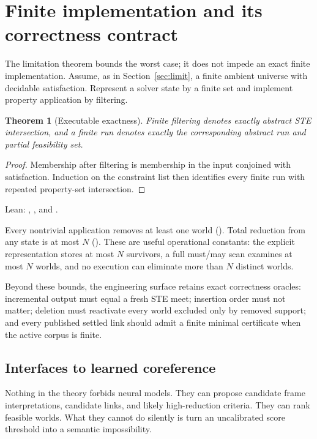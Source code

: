 \documentclass[11pt]{article}
\newtheorem{theorem}{Theorem}[section]
\theoremstyle{definition}
\theoremstyle{remark}
\begin{document}
\section{Finite implementation and its correctness contract}
\label{sec:implementation}

The limitation theorem bounds the worst case; it does not impede an exact
finite implementation.  Assume, as in Section~\ref{sec:limit}, a finite
ambient universe with decidable satisfaction.  Represent a solver state by a
finite set and implement property application by filtering.

\begin{theorem}[Executable exactness]
Finite filtering denotes exactly abstract STE intersection, and a finite run
denotes exactly the corresponding abstract run and partial feasibility set.
\end{theorem}
\begin{proof}
Membership after filtering is membership in the input conjoined with
satisfaction.  Induction on the constraint list then identifies every finite
run with repeated property-set intersection.
\end{proof}
\noindent Lean: , , and
.

Every nontrivial application removes at least one world
().  Total reduction from any state is at most $N$
().  These are useful operational constants:
the explicit representation stores at most $N$ survivors, a full must/may scan
examines at most $N$ worlds, and no execution can eliminate more than $N$
distinct worlds.

Beyond these bounds, the engineering surface retains exact correctness
oracles: incremental output must equal a fresh STE meet; insertion order must
not matter; deletion must reactivate every world excluded only by removed
support; and every published settled link should admit a finite minimal
certificate when the active corpus is finite.

\subsection{Interfaces to learned coreference}

Nothing in the theory forbids neural models.  They can propose candidate frame
interpretations, candidate links, and likely high-reduction criteria.  They can
rank feasible worlds.  What they cannot do silently is turn an uncalibrated
score threshold into a semantic impossibility.
\end{document}

